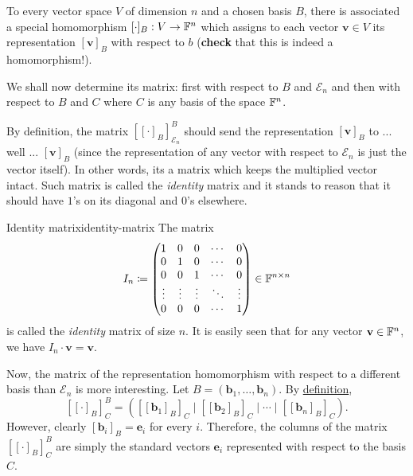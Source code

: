 To every vector space $V$ of dimension $n$ and a chosen basis $B$, there is
associated a special homomorphism $[ \cdot ]_B:V \to \mathbb{F}^{n}$ which assigns to
each vector $\mathbf{v} \in V$ its representation $[\mathbf{v}]_B$ with respect
to $b$ (\textbf{check} that this is indeed a homomorphism!).

We shall now determine its matrix: first with respect to $B$ and $\mathcal{E}_n$
and then with respect to $B$ and $C$ where $C$ is any basis of the space
$\mathbb{F}^{n}$.

By definition, the matrix $\left[ [ \cdot ]_B \right]^{B}_{\mathcal{E}_n}$
should send the representation $[\mathbf{v}]_{B}$ to ... well ...
$[\mathbf{v}]_B$ (since the representation of any vector with respect to
$\mathcal{E}_n$ is just the vector itself). In other words, its a matrix which
keeps the multiplied vector intact. Such matrix is called the \emph{identity}
matrix and it stands to reason that it should have $1$'s on its diagonal and
$0$'s elsewhere.

\begin{definition}{Identity matrix}{identity-matrix}
 The matrix
 \[
  I_n \coloneqq \begin{pmatrix}
   1 & 0 & 0 & \cdots & 0\\
   0 & 1 & 0 & \cdots & 0\\
   0 & 0 & 1 & \cdots & 0\\
   \vdots & \vdots & \vdots & \ddots & \vdots\\
   0 & 0 & 0 & \cdots & 1
  \end{pmatrix} \in \mathbb{F}^{n \times n}
 \]
 is called the \emph{identity} matrix of size $n$. It is easily seen that for
 any vector $\mathbf{v} \in \mathbb{F}^{n}$, we have $I_n \cdot \mathbf{v} =
 \mathbf{v}$.
\end{definition}

Now, the matrix of the representation homomorphism with respect to a different
basis than $\mathcal{E}_n$ is more interesting. Let $B =
(\mathbf{b}_1,\ldots,\mathbf{b}_n)$. By
\hyperref[def:matrix-of-a-homomorphism]{definition},
\[
 \left[ [ \cdot ]_B \right]^{B}_C = \left( 
  [[\mathbf{b}_1]_B]_C \mid [[\mathbf{b}_2]_B]_C \mid \cdots \mid
  [[\mathbf{b}_n]_B]_C
 \right).
\]
However, clearly $[\mathbf{b}_i]_B = \mathbf{e}_i$ for every $i$. Therefore, the
columns of the matrix $[[ \cdot ]_B]_{C}^{B}$ are simply the standard vectors
$\mathbf{e}_i$ represented with respect to the basis $C$.

